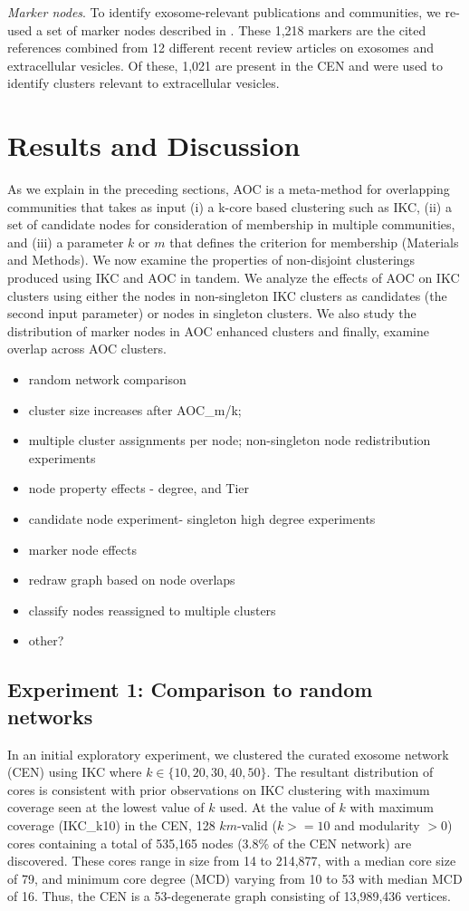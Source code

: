 \documentclass[12pt, oneside]{article}   	%
\begin{document}
	\emph{Marker nodes}. To identify exosome-relevant publications and communities, we re-used a set of marker nodes described in  \citep{Wedell2022}. These 1,218 markers are the cited references combined from 12 different recent review articles on exosomes and extracellular vesicles. Of these, 1,021 are present in the CEN and  were used to identify clusters relevant to extracellular vesicles.
	
	\section{Results and Discussion}
	
	As we explain in the preceding sections, AOC is a meta-method for overlapping communities that takes as input (i) a k-core based clustering such as IKC, (ii) a set of candidate nodes for consideration of membership in multiple communities, and (iii) a parameter $k$ or $m$ that defines the criterion for membership (Materials and Methods). We now examine the properties of non-disjoint clusterings produced using IKC and AOC in tandem. We analyze the effects of AOC on IKC clusters using either the nodes in non-singleton IKC clusters as candidates (the second input parameter) or nodes in singleton clusters. We also study the distribution of marker nodes in AOC enhanced clusters and finally, examine overlap across AOC clusters. 
	
	\begin{itemize}
		\item random network comparison
		\item cluster size increases after AOC\_m/k; 
		\item multiple cluster assignments per node; non-singleton node redistribution experiments
		\item node property effects - degree, and Tier
		\item candidate node experiment- singleton high degree experiments
		\item marker node effects
		\item redraw graph based on node overlaps
		\item classify nodes reassigned to multiple clusters
		\item other?
	\end{itemize}
	
	\subsection{Experiment 1: Comparison to random networks} In an initial exploratory experiment, we clustered the curated exosome network (CEN) using IKC where $k \in {\{10,20,30,40, 50\}}$. 
	The resultant distribution of cores is consistent with prior observations on IKC clustering \citep[Figure 3]{Wedell2022} with maximum coverage seen at the lowest value of $k$ used. At the value of $k$ with maximum coverage (IKC\_k10) in the CEN, 128 $km$-valid ($k >=10$ and modularity $> 0$) cores containing a total of 535,165 nodes (3.8\% of the CEN network) are discovered. These cores range in size from 14 to 214,877, with a median core size of 79, and minimum core degree (MCD) varying from 10 to 53 with median MCD of 16. Thus, the CEN is a 53-degenerate graph consisting of 13,989,436 vertices.
	
\end{document}
